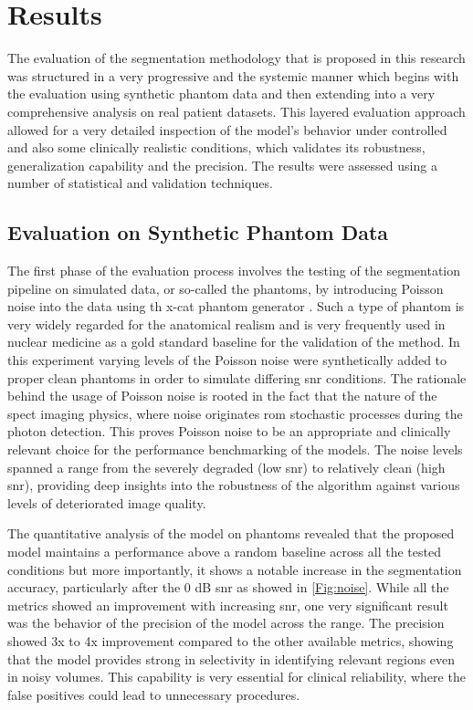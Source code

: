 \chapter{Results}
\label{ch:results}

The evaluation of the segmentation methodology that is proposed in this research was structured in a very progressive and the systemic manner which begins with the evaluation using synthetic phantom data and then extending into a very comprehensive analysis on real patient datasets. This layered evaluation approach allowed for a very detailed inspection of the model's behavior under controlled and also some clinically realistic conditions, which validates its robustness, generalization capability and the precision. The results were assessed using a number of statistical and validation techniques.

\section{Evaluation on Synthetic Phantom Data}
The first phase of the evaluation process involves the testing of the segmentation pipeline on simulated data, or so-called the phantoms, by introducing Poisson noise into the data using th x-cat phantom generator \cite{xcat}. Such a type of phantom is very widely regarded for the anatomical realism and is very frequently used in nuclear medicine as a gold standard baseline for the validation of the method. In this experiment varying levels of the Poisson noise were synthetically added to proper clean phantoms in order to simulate differing \gls{snr} conditions. The rationale behind the usage of Poisson noise is rooted in the fact that the nature of the \gls{spect} imaging physics, where noise originates rom stochastic processes during the photon detection. This proves Poisson noise to be an appropriate and clinically relevant choice for the performance benchmarking of the models. The noise levels spanned a range from the severely degraded (low \gls{snr}) to relatively clean (high \gls{snr}), providing deep insights into the robustness of the algorithm against various levels of deteriorated image quality.

The quantitative analysis of the model on phantoms revealed that the proposed model maintains a performance above a random baseline across all the tested conditions but more importantly, it shows a notable increase in the segmentation accuracy, particularly after the 0 dB \gls{snr} as showed in \cref{Fig:noise}. While all the metrics showed an improvement with increasing \gls{snr}, one very significant result was the behavior of the precision of the model across the range. The precision showed 3x to 4x improvement compared to the other available metrics, showing that the model provides strong in selectivity in identifying relevant regions even in noisy volumes. This capability is very essential for clinical reliability, where the false positives could lead to unnecessary procedures.

